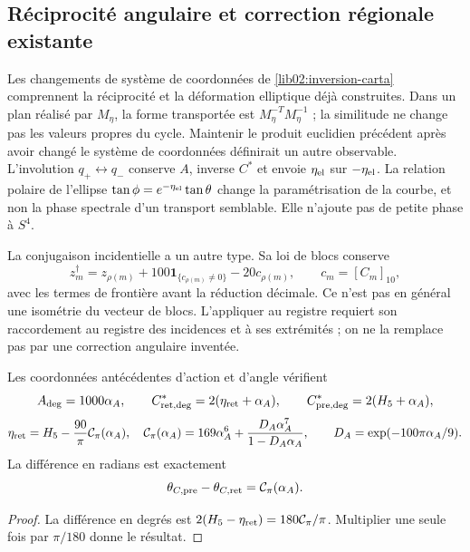 \subsection{Réciprocité angulaire et correction régionale existante}
\label{lib02:correccion-regional}

Les changements de système de coordonnées de \cref{lib02:inversion-carta} comprennent la
réciprocité et la déformation elliptique déjà construites. Dans un plan
réalisé par \(M_\eta\), la forme transportée est
\(M_\eta^{-T}M_\eta^{-1}\) ; la similitude ne change pas les
valeurs propres du cycle. Maintenir le produit euclidien précédent après avoir
changé le système de coordonnées définirait un autre observable. L’involution
\(q_+\leftrightarrow q_-\) conserve \(A\), inverse \(C^*\)
et envoie \(\eta_{\rm el}\) sur \(-\eta_{\rm el}\). La relation
polaire de l’ellipse
\(\tan\phi=e^{-\eta_{\rm el}}\tan\theta\) change la
paramétrisation de la courbe, et non la phase spectrale d’un transport
semblable. Elle n’ajoute pas de petite phase à \(S^4\).

La conjugaison incidentielle a un autre type. Sa loi de blocs conserve
\[
 z_m^\dagger=z_{\rho(m)}
 +100\mathbf1_{\{c_{\rho(m)}\ne0\}}-20c_{\rho(m)},
 \qquad c_m=[C_m]_{10},
\]
avec les termes de frontière avant la réduction décimale. Ce n’est pas en
général une isométrie du vecteur de blocs. L’appliquer au registre
requiert son raccordement au registre des incidences et à ses extrémités ; on ne la
remplace pas par une correction angulaire inventée.

\begin{proposition}
\label{lib02:retorno-regional}
Les coordonnées antécédentes d’action et d’angle vérifient
\[
 A_{\rm deg}=1000\alpha_A,\qquad
 C^*_{\rm ret,deg}=2(\eta_{\rm ret}+\alpha_A),\qquad
 C^*_{\rm pre,deg}=2(H_5+\alpha_A),
\]
\[
 \eta_{\rm ret}=H_5-\frac{90}{\pi}\mathcal C_\pi(\alpha_A),
 \quad
 \mathcal C_\pi(\alpha_A)=169\alpha_A^6+
 \frac{D_A\alpha_A^7}{1-D_A\alpha_A},\qquad
 D_A=\exp(-100\pi\alpha_A/9).
\]
La différence en radians est exactement
\[
 \theta_{C,\rm pre}-\theta_{C,\rm ret}=\mathcal C_\pi(\alpha_A).
\]
\end{proposition}
\begin{proof}
La différence en degrés est \(2(H_5-\eta_{\rm ret})=180\mathcal C_\pi/\pi\). Multiplier une seule fois par \(\pi/180\) donne le résultat.
\end{proof}

